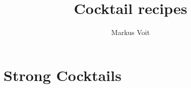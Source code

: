 \documentclass[
  DIV=11,%
  pagesize,%
  fontsize=11pt,
  paper=a4,%
  numbers=noenddot,
]{scrartcl}
\title{Cocktail recipes}
\author{Markus Voit}
\begin{document}
\maketitle
\clearpage
\tableofcontents
\clearpage

\section{Strong Cocktails}
\newpage
\newpage
\newpage
\end{document}
